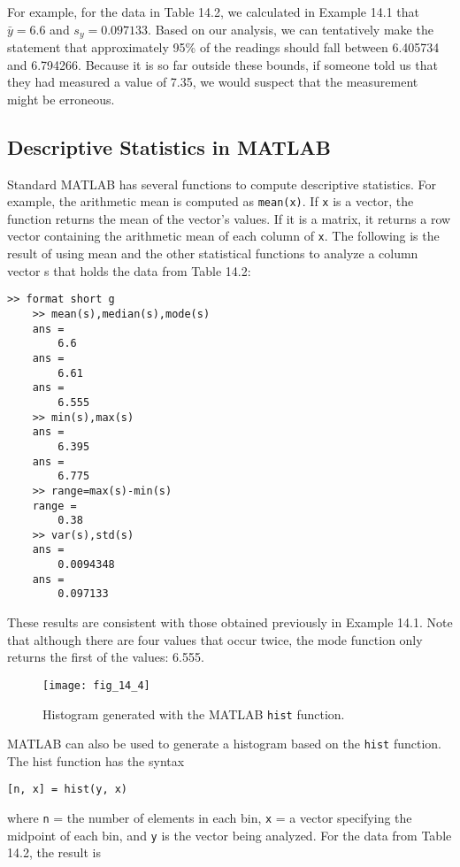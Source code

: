 \documentclass[../main.tex]{subfiles}
\begin{document}
For example, for the data in Table 14.2, we calculated in Example 14.1 that $\bar{y} = 6.6$
and $s_y = 0.097133$. Based on our analysis, we can tentatively make the statement that
approximately 95\% of the readings should fall between 6.405734 and 6.794266. Because it
is so far outside these bounds, if someone told us that they had measured a value of 7.35, we
would suspect that the measurement might be erroneous.

\label{cha:cha_P_14_1_3}
\subsection{Descriptive Statistics in MATLAB}

\noindent Standard MATLAB has several functions to compute descriptive statistics. For example,
the arithmetic mean is computed as \texttt{mean(x)}. If \texttt{x} is a vector, the function returns the mean
of the vector's values. If it is a matrix, it returns a row vector containing the arithmetic
mean of each column of \texttt{x}. The following is the result of using mean and the other statistical functions to analyze a column vector s that holds the data from Table 14.2:

\begin{lstlisting}[numbers=none]
	>> format short g
	>> mean(s),median(s),mode(s)
	ans =
		6.6
	ans =
		6.61
	ans =
		6.555
	>> min(s),max(s)
	ans =
		6.395
	ans =
		6.775
	>> range=max(s)-min(s)
	range =
		0.38
	>> var(s),std(s)
	ans =
		0.0094348
	ans =
		0.097133
\end{lstlisting}

\noindent These results are consistent with those obtained previously in Example 14.1. Note that
although there are four values that occur twice, the mode function only returns the first of
the values: 6.555.

\begin{figure}[H]
	\centering
	\texttt{[image: fig\_14\_4]}
	\caption{\textsf{Histogram generated with the MATLAB \texttt{hist} function.}}
	\label{fig:fig_14_4}
\end{figure}

MATLAB can also be used to generate a histogram based on the \texttt{hist}  function. The
hist function has the syntax

\begin{lstlisting}[numbers=none]
	[n, x] = hist(y, x)
\end{lstlisting}

\noindent where \texttt{n} = the number of elements in each bin, \texttt{x} = a vector specifying the midpoint of
each bin, and \texttt{y} is the vector being analyzed. For the data from Table 14.2, the result is
\end{document}
